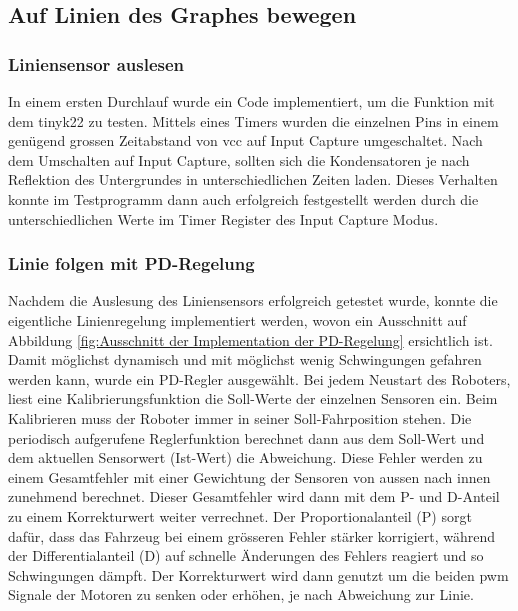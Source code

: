 
\subsection{Auf Linien des Graphes bewegen}
\label{Auf Linien des Graphes bewegen}

\subsubsection{Liniensensor auslesen}
\label{Liniensensor auslesen}

In einem ersten Durchlauf wurde ein Code implementiert, um die Funktion mit dem \gls{tinyk22} zu testen. Mittels eines Timers wurden die einzelnen Pins in einem genügend grossen Zeitabstand von \acrfull{vcc} auf Input Capture umgeschaltet. Nach dem Umschalten auf Input Capture, sollten sich die Kondensatoren je nach Reflektion des Untergrundes in unterschiedlichen Zeiten laden. Dieses Verhalten konnte im Testprogramm dann auch erfolgreich festgestellt werden durch die unterschiedlichen Werte im Timer Register des Input Capture Modus.


\subsubsection{Linie folgen mit PD-Regelung}
\label{Linie folgen mit PD-Regelung}

Nachdem die Auslesung des Liniensensors erfolgreich getestet wurde, konnte die eigentliche Linienregelung implementiert werden, wovon ein Ausschnitt auf Abbildung \ref{fig:Ausschnitt der Implementation der PD-Regelung} ersichtlich ist. Damit möglichst dynamisch und mit möglichst wenig Schwingungen gefahren werden kann, wurde ein PD-Regler ausgewählt. Bei jedem Neustart des Roboters, liest eine Kalibrierungsfunktion die Soll-Werte der einzelnen Sensoren ein. Beim Kalibrieren muss der Roboter immer in seiner Soll-Fahrposition stehen. Die periodisch aufgerufene Reglerfunktion berechnet dann aus dem Soll-Wert und dem aktuellen Sensorwert (Ist-Wert) die Abweichung. Diese Fehler werden zu einem Gesamtfehler mit einer Gewichtung der Sensoren von aussen nach innen zunehmend berechnet. Dieser Gesamtfehler wird dann mit dem P- und D-Anteil zu einem Korrekturwert weiter verrechnet. Der Proportionalanteil (P) sorgt dafür, dass das Fahrzeug bei einem grösseren Fehler stärker korrigiert, während der Differentialanteil (D) auf schnelle Änderungen des Fehlers reagiert und so Schwingungen dämpft. Der Korrekturwert wird dann genutzt um die beiden \acrfull{pwm} Signale der Motoren zu senken oder erhöhen, je nach Abweichung zur Linie.

